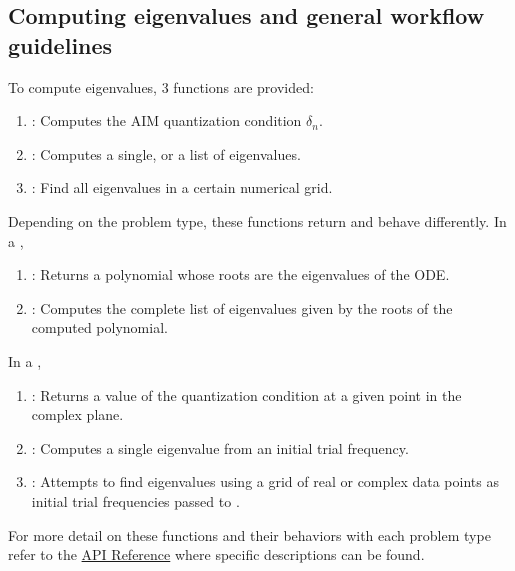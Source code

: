 \subsection{Computing eigenvalues and general workflow guidelines}

To compute eigenvalues, 3 functions are provided:
%
\begin{enumerate}
  \item {}: Computes the AIM quantization condition $\delta_n$.
  \item {}: Computes a single, or a list of eigenvalues.
  \item {}: Find all eigenvalues in a certain numerical grid.
\end{enumerate}

Depending on the problem type, these functions return and behave differently. In a ,
%
\begin{enumerate}
  \item {}: Returns a polynomial whose roots are the eigenvalues of the ODE.
  \item {}: Computes the complete list of eigenvalues given by the roots of the computed polynomial.
\end{enumerate}
%
In a ,
%
\begin{enumerate}
  \item {}: Returns a value of the quantization condition at a given point in the complex plane.
  \item {}: Computes a single eigenvalue from an initial trial frequency.
  \item {}: Attempts to find eigenvalues using a grid of real or complex data points as initial trial frequencies passed to .
\end{enumerate}
%
For more detail on these functions and their behaviors with each problem type refer to the \href{https://lucass-carneiro.github.io/QuasinormalModes.jl/stable/api_ref/}{API Reference} where specific descriptions can be found.

